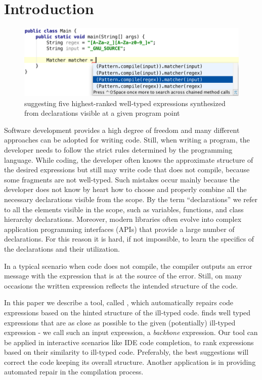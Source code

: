 \section{Introduction}
\label{sec:intro}

\begin{figure}[!tbh]
\includegraphics[natwidth=\textwidth]{RegexMatcher.png}
\caption{{\ourTool} suggesting five highest-ranked 
well-typed expressions synthesized from declarations visible at a given program point\label{screenshot}}
\end{figure}


Software development provides a high degree of freedom and
many different approaches can be adopted for writing
code. Still, when writing a program, the developer needs to follow
the strict rules determined by the programming language. While coding, the developer often knows the
approximate structure of the desired expressions but still may write code
that does not compile, because some fragments are not well-typed.
Such mistakes occur mainly because the developer does not
know by heart how to choose and properly combine all the necessary
declarations visible from the scope. By the term ``declarations'' 
we refer to all the elements visible in the scope, such as variables, functions, and class
hierarchy declarations.
Moreover, modern libraries often evolve into complex 
application programming interfaces (APIs) that provide
a large number of declarations. For this reason 
it is hard, if not impossible, to learn the specifics of
the declarations and their utilization.

In a typical scenario when code does not compile, the compiler outputs
an error message with the expression that is at the source of the
error. Still, on many occasions the written expression reflects the
intended structure of the code. 

In this paper we describe a tool, called \ourTool, which
automatically repairs code expressions based on the hinted structure
of the ill-typed code. \ourTool finds well typed expressions that are as close as 
possible to the given (potentially) ill-typed expression - we call such an
input expression, a {\em backbone} expression. Our tool can be applied 
in interactive scenarios like IDE code completion, to rank expressions 
based on their similarity to ill-typed code. Preferably, the best
suggestions will correct the code keeping its overall structure.
Another application is in providing automated repair in the compilation process.


